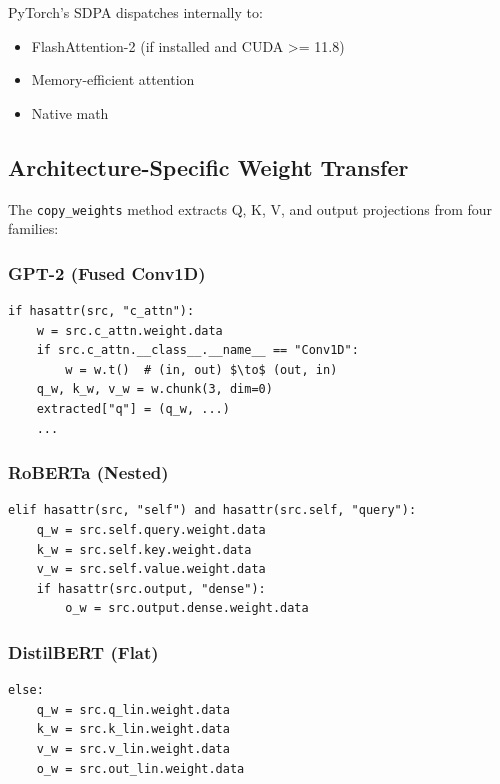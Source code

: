 PyTorch's SDPA dispatches internally to:
\begin{itemize}
\item FlashAttention-2 (if installed and CUDA >= 11.8)
\item Memory-efficient attention
\item Native math

\end{itemize}
\subsection{Architecture-Specific Weight Transfer}

The \texttt{copy\_weights} method extracts Q, K, V, and output projections from four 
families:

\subsubsection{GPT-2 (Fused Conv1D)}

\begin{lstlisting}
if hasattr(src, "c_attn"):
    w = src.c_attn.weight.data
    if src.c_attn.__class__.__name__ == "Conv1D":
        w = w.t()  # (in, out) $\to$ (out, in)
    q_w, k_w, v_w = w.chunk(3, dim=0)
    extracted["q"] = (q_w, ...)
    ...
\end{lstlisting}

\subsubsection{RoBERTa (Nested)}

\begin{lstlisting}
elif hasattr(src, "self") and hasattr(src.self, "query"):
    q_w = src.self.query.weight.data
    k_w = src.self.key.weight.data
    v_w = src.self.value.weight.data
    if hasattr(src.output, "dense"):
        o_w = src.output.dense.weight.data
\end{lstlisting}

\subsubsection{DistilBERT (Flat)}

\begin{lstlisting}
else:
    q_w = src.q_lin.weight.data
    k_w = src.k_lin.weight.data
    v_w = src.v_lin.weight.data
    o_w = src.out_lin.weight.data
\end{lstlisting}

